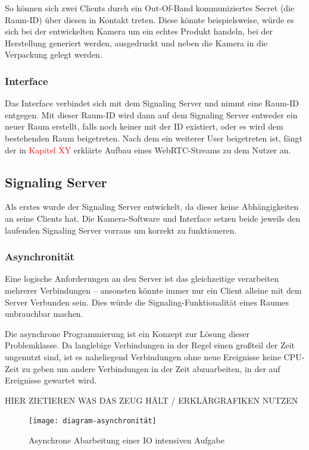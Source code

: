 \documentclass{IEEEtran}
\begin{document}
\begin{twocolumn}
So können sich zwei Clients durch ein Out-Of-Band kommuniziertes Secret (die
Raum-ID) über diesen in Kontakt treten. Diese könnte beispielsweise, würde es
sich bei der entwickelten Kamera um ein echtes Produkt handeln, bei der
Herstellung generiert werden, ausgedruckt und neben die Kamera in die
Verpackung gelegt werden.

\subsubsection{Interface}

Das Interface verbindet sich mit dem Signaling Server und nimmt eine Raum-ID
entgegen. Mit dieser Raum-ID wird dann auf dem Signaling Server entweder ein
neuer Raum erstellt, falls noch keiner mit der ID existiert, oder es wird dem
bestehenden Raum beigetreten. Nach dem ein weiterer User beigetreten ist, fängt
der in \textcolor{red}{Kapitel XY} erklärte Aufbau eines WebRTC-Streams zu dem
Nutzer an.

\subsection{Signaling Server}

Als erstes wurde der Signaling Server entwickelt, da dieser keine
Abhängigkeiten an seine Clients hat. Die Kamera-Software und Interface setzen
beide jeweils den laufenden Signaling Server vorraus um korrekt zu
funktioneren.

\subsubsection*{Asynchronität}

Eine logische Anforderungen an den Server ist das gleichzeitige verarbeiten
mehrerer Verbindungen – ansonsten könnte immer nur ein Client alleine mit dem
Server Verbunden sein. Dies würde die Signaling-Funktionalität eines Raumes
unbrauchbar machen.

Die asynchrone Programmierung ist ein Konzept zur Lösung dieser Problemklasse.
Da langlebige Verbindungen in der Regel einen großteil der Zeit ungenutzt sind,
ist es naheliegend Verbindungen ohne neue Ereignisse keine CPU-Zeit zu geben
um andere Verbindungen in der Zeit abzuarbeiten, in der auf Ereignisse gewartet
wird.

HIER ZIETIEREN WAS DAS ZEUG HÄLT / ERKLÄRGRAFIKEN NUTZEN

\begin{figure}[ht]
	\texttt{[image: diagram-asynchronität]}
	\centering
	\caption{Asynchrone Abarbeitung einer IO intensiven Aufgabe}
\end{figure}


\end{twocolumn}
\end{document}
